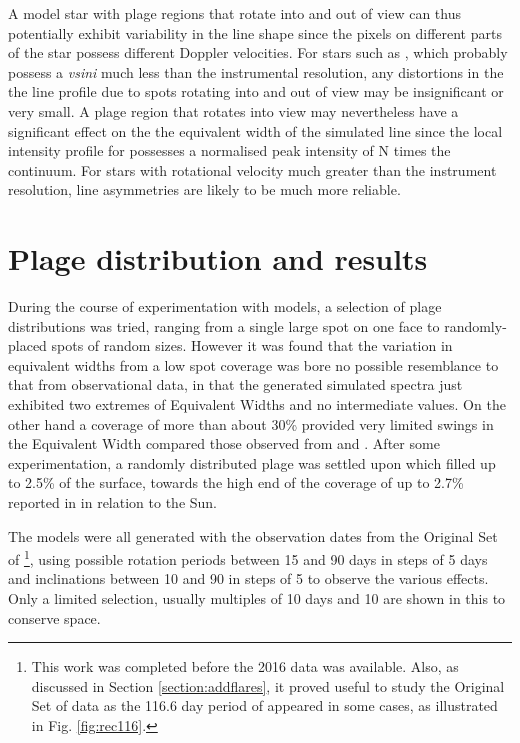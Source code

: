A model star with plage regions that rotate into and out of view can thus potentially exhibit variability in the line
shape since the pixels on different parts of the star possess different Doppler velocities. For stars such as \prox,
which probably possess a \textit{vsini} much less than the instrumental resolution, any distortions in the the line
profile due to spots rotating into and out of view may be insignificant or very small. A plage region that rotates into
view may nevertheless have a significant effect on the the equivalent width of the simulated line since the
local intensity profile for {\ha} possesses a normalised peak intensity of N times the continuum. For stars with
rotational velocity much greater than the instrument resolution, line asymmetries are likely to be much more reliable.

\section{Plage distribution and results}
\protect\label{section:plagedists}

During the course of experimentation with models, a selection of plage distributions was tried, ranging from a single
large spot on one face to randomly-placed spots of random sizes. However it was found that the variation in equivalent
widths from a low spot coverage was bore no possible resemblance to that from observational data, in that the generated
simulated spectra just exhibited two extremes of Equivalent Widths and no intermediate values. On the other hand a
coverage of more than about 30\% provided very limited swings in the Equivalent Width compared those observed from
{\harps} and {\uves}. After some experimentation, a randomly distributed plage was settled upon which filled up to 2.5\%
of the surface, towards the high end of the coverage of up to 2.7\% reported in \citet{guttenbrunner14} in relation to
the Sun.

The models were all generated with the observation dates from the Original Set of {\harps}\footnote{This work was
  completed before the 2016 data was available. Also, as discussed in Section \ref{section:addflares}, it proved useful
  to study the Original Set of data as the 116.6 day period of \citet[Table 3]{suarezmascareno15} appeared in some
  cases, as illustrated in Fig. \ref{fig:rec116}.}, using possible rotation periods between 15 and 90 days in steps of 5
days and inclinations between 10{\degree} and 90{\degree} in steps of 5{\degree} to observe the various effects. Only a
limited selection, usually multiples of 10 days and 10{\degree} are shown in this {\paperorthesis} to conserve space.

